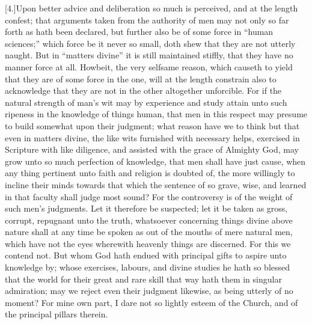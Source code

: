 [4.]Upon better advice and deliberation so much is perceived, and at the length confest; that arguments taken from the authority of men may not only so far forth as hath been declared, but further also be of some force in “human sciences;” which force be it never so small, doth shew that they are not utterly naught. But in “matters divine” it is still maintained stiffly, that they have no manner force at all. Howbeit, the very selfsame reason, which causeth to yield that they are of some force in the one, will at the length constrain also to acknowledge that they are not in the other altogether unforcible. For if the natural strength of man’s wit may by experience and study attain unto such ripeness in the knowledge of things human, that men in this respect may  presume to build somewhat upon their judgment; what reason have we to think but that even in matters divine, the like wits furnished with necessary helps, exercised in Scripture with like diligence, and assisted with the grace of Almighty God, may grow unto so much perfection of knowledge, that men shall have just cause, when any thing pertinent unto faith and religion is doubted of, the more willingly to incline their minds towards that which the sentence of so grave, wise, and learned in that faculty shall judge most sound? For the controversy is of the weight of such men’s judgments. Let it therefore be suspected; let it be taken as gross, corrupt, repugnant unto the truth, whatsoever concerning things divine above nature shall at any time be spoken as out of the mouths of mere natural men, which have not the eyes wherewith heavenly things are discerned. For this we contend not. But whom God hath endued with principal gifts to aspire unto knowledge by; whose exercises, labours, and divine studies he hath so blessed that the world for their great and rare skill that way hath them in singular admiration; may we reject even their judgment likewise, as being utterly of no moment? For mine own part, I dare not so lightly esteem of the Church, and of the principal pillars therein.

